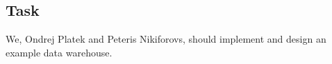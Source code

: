 \addtocounter{chapter}{1}
\subsection*{Task} %
\label{sub:Task}
We, Ondrej Platek and Peteris Nikiforovs, should implement and design an example data warehouse.

